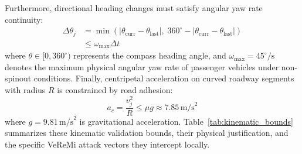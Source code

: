 \documentclass[conference]{IEEEtran}
\begin{document}
Furthermore, directional heading changes must satisfy angular yaw rate continuity:
\begin{equation}
\begin{aligned}
\Delta \theta_j &= \min\left(|\theta_{\text{curr}} - \theta_{\text{last}}|, \; 360^\circ - |\theta_{\text{curr}} - \theta_{\text{last}}|\right) \\
&\le \omega_{\text{max}} \Delta t
\end{aligned}
\label{eq:heading_bound}
\end{equation}
where $\theta \in [0, 360^\circ)$ represents the compass heading angle, and $\omega_{\text{max}} = 45^\circ/\text{s}$ denotes the maximum physical angular yaw rate of passenger vehicles under non-spinout conditions. Finally, centripetal acceleration on curved roadway segments with radius $R$ is constrained by road adhesion:
\begin{equation}
a_c = \frac{v_j^2}{R} \le \mu g \approx 7.85\,\text{m/s}^2
\label{eq:centripetal}
\end{equation}
where $g = 9.81\,\text{m/s}^2$ is gravitational acceleration. Table~\ref{tab:kinematic_bounds} summarizes these kinematic validation bounds, their physical justification, and the specific VeReMi attack vectors they intercept locally.

\begin{table}[htbp]
\centering
\caption{Tier 1 OBU Kinematic and Physical Possibility Validation Bounds}
\label{tab:kinematic_bounds}
\end{table}
\end{document}
